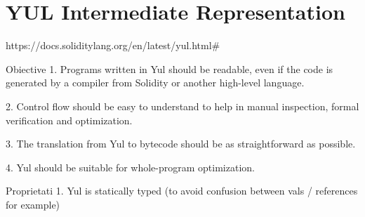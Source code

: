 \chapter*{YUL Intermediate Representation} 


https://docs.soliditylang.org/en/latest/yul.html#

Obiective
1. Programs written in Yul should be readable, even if the code is generated by a compiler from Solidity or another high-level language.

2. Control flow should be easy to understand to help in manual inspection, formal verification and optimization.

3. The translation from Yul to bytecode should be as straightforward as possible.

4. Yul should be suitable for whole-program optimization.


Proprietati
1. Yul is statically typed (to avoid confusion between vals / references for example)
